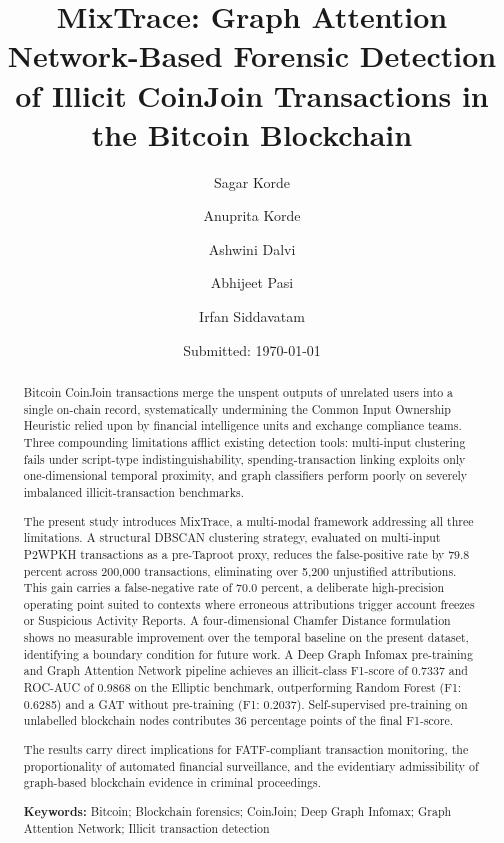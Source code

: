 \documentclass[12pt,a4paper]{article}
\title{\textbf{MixTrace: Graph Attention Network-Based
       Forensic Detection of Illicit CoinJoin Transactions
       in the Bitcoin Blockchain}}
\author[1]{Sagar Korde}
\author[1]{Anuprita Korde}
\author[1]{Ashwini Dalvi}
\author[2]{Abhijeet Pasi}
\author[1]{Irfan Siddavatam}
\affil[1]{\small Department of Information Technology,
          K.\,J. Somaiya School of Engineering,
          Somaiya Vidyavihar University,
          Vidyavihar, Mumbai, India}
\affil[2]{\small Department of Computer Engineering,
          K.\,J. Somaiya School of Engineering,
          Somaiya Vidyavihar University,
          Vidyavihar, Mumbai, India}
\date{\small Submitted: \today}
\begin{document}
\maketitle
\thispagestyle{fancy}

\begin{abstract}
\noindent
Bitcoin CoinJoin transactions merge the unspent outputs of
unrelated users into a single on-chain record, systematically
undermining the Common Input Ownership Heuristic relied upon by
financial intelligence units and exchange compliance teams.
Three compounding limitations afflict existing detection tools:
multi-input clustering fails under script-type
indistinguishability, spending-transaction linking exploits only
one-dimensional temporal proximity, and graph classifiers perform
poorly on severely imbalanced illicit-transaction benchmarks.

The present study introduces MixTrace, a multi-modal framework
addressing all three limitations. A structural DBSCAN clustering
strategy, evaluated on multi-input P2WPKH transactions as a
pre-Taproot proxy, reduces the false-positive rate by 79.8
percent across 200,000 transactions, eliminating over 5,200
unjustified attributions. This gain
carries a false-negative rate of 70.0 percent, a deliberate
high-precision operating point suited to contexts where erroneous
attributions trigger account freezes or Suspicious Activity
Reports. A four-dimensional Chamfer Distance formulation shows
no measurable improvement over the temporal baseline on the
present dataset, identifying a boundary condition for future
work. A Deep Graph Infomax pre-training and Graph Attention
Network pipeline achieves an illicit-class F1-score of 0.7337
and ROC-AUC of 0.9868 on the Elliptic benchmark, outperforming
Random Forest (F1: 0.6285) and a GAT without pre-training
(F1: 0.2037). Self-supervised pre-training on unlabelled
blockchain nodes contributes 36 percentage points of the
final F1-score.

The results carry direct implications for FATF-compliant
transaction monitoring, the proportionality of automated
financial surveillance, and the evidentiary admissibility of
graph-based blockchain evidence in criminal proceedings.

\smallskip\noindent\textbf{Keywords:} Bitcoin;
Blockchain forensics;
CoinJoin;
Deep Graph Infomax;
Graph Attention Network;
Illicit transaction detection
\end{abstract}
\end{document}
